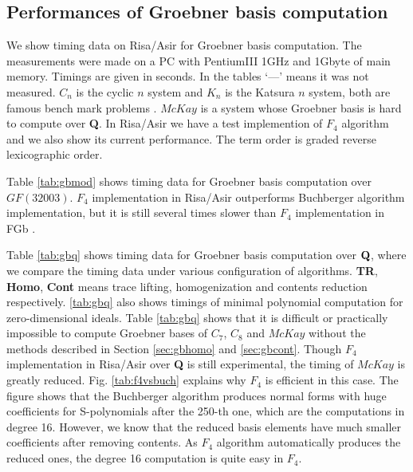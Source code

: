 \documentclass[runningheads]{cl2emult}
\def\Q{{\bf Q}}
\begin{document}

\subsection{Performances of Groebner basis computation}

We show timing data on Risa/Asir for Groebner basis computation.  The
measurements were made on a PC with PentiumIII 1GHz and 1Gbyte of main
memory. Timings are given in seconds. In the tables `---' means it was
not measured.  $C_n$ is the cyclic $n$ system and $K_n$ is the Katsura
$n$ system, both are famous bench mark problems \cite{noro:BENCH}.  $McKay$
\cite{noro:REPL} is a system whose Groebner basis is hard to compute over
{\bf Q}.  In Risa/Asir we have a test implemention of $F_4$ algorithm
\cite{noro:F4} and we also show its current performance.  The term order is
graded reverse lexicographic order.

Table \ref{tab:gbmod} shows timing data for Groebner basis computation
over $GF(32003)$.  $F_4$ implementation in Risa/Asir outperforms
Buchberger algorithm implementation, but it is still several times
slower than $F_4$ implementation in FGb \cite{noro:FGB}.

Table \ref{tab:gbq} shows timing data for Groebner basis computation over
$\Q$, where we compare the timing data under various configuration of
algorithms. {\bf TR}, {\bf Homo}, {\bf Cont} means trace lifting,
homogenization and contents reduction respectively.
\ref{tab:gbq} also shows timings of minimal polynomial
computation for zero-dimensional ideals.  Table \ref{tab:gbq} shows that
it is difficult or practically impossible to compute Groebner bases of
$C_7$, $C_8$ and $McKay$ without the methods described in Section
\ref{sec:gbhomo} and \ref{sec:gbcont}.
Though $F_4$ implementation in Risa/Asir over {\bf Q} is still
experimental, the timing of $McKay$ is greatly reduced.
Fig. \ref{tab:f4vsbuch} explains why $F_4$ is efficient in this case.  The
figure shows that the Buchberger algorithm produces normal forms with
huge coefficients for S-polynomials after the 250-th one, which are
the computations in degree 16.  However, we know that the reduced
basis elements have much smaller coefficients after removing contents.
As $F_4$ algorithm automatically produces the reduced ones, the degree
16 computation is quite easy in $F_4$.
\end{document}
